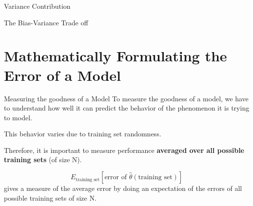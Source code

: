 \documentclass{beamer}
\begin{document}
\begin{frame}{Variance Contribution}

\end{frame}

\begin{frame}{The Bias-Variance Trade off}
\end{frame}

\section{Mathematically Formulating the Error of a Model}

\begin{frame}{Measuring the goodness of a Model}
To measure the goodness of a model, we have to understand how well it can predict the behavior of the phenomenon it is trying to model.
\pause

This behavior varies due to training set randomness.
\pause 

Therefore, it is important to measure performance \textbf{averaged over all possible training sets} (of size N). 
\pause

$$E_{\text{training set}}[\text{error of } \hat\theta(\text{training set})] $$
gives a measure of the average error by doing an expectation of the errors of all possible training sets of size N.
\end{frame}
\end{document}
